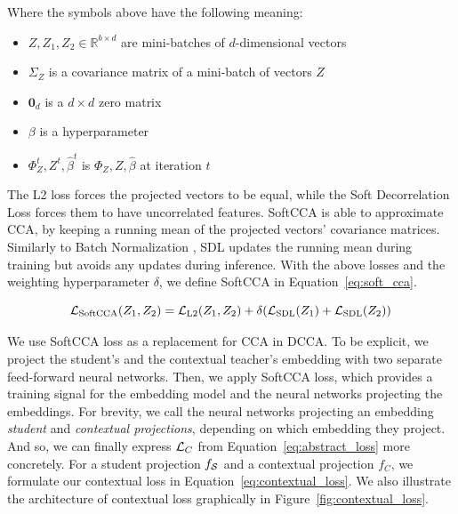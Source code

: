 Where the symbols above have the following meaning:

\begin{itemize}

  \item $Z, Z_1, Z_2 \in \mathbb{R}^{b \times d}$ are mini-batches of
    $d$-dimensional vectors

  \item $\Sigma_{Z}$ is a covariance matrix of a mini-batch of vectors $Z$

  \item $\bm{0}_d$ is a $d \times d$ zero matrix

  \item $\beta$ is a hyperparameter

  \item $\Phi_Z^t, Z^t, \hat{\beta}^t$ is $\Phi_Z, Z, \hat{\beta}$ at iteration
    $t$

\end{itemize}

The L2 loss forces the projected vectors to be equal, while the Soft
Decorrelation Loss forces them to have uncorrelated features. SoftCCA is able
to approximate CCA, by keeping a running mean of the projected vectors'
covariance matrices. Similarly to Batch Normalization \citep{ioffe2015batch},
SDL updates the running mean during training but avoids any updates during
inference. With the above losses and the weighting hyperparameter $\delta$, we
define SoftCCA in Equation~\ref{eq:soft_cca}.

\begin{equation}\label{eq:soft_cca}
  \mathcal{L}_{\text{SoftCCA}}(Z_1, Z_2) = \mathcal{L}_{\text{L2}}(Z_1, Z_2) +
      \delta ( \mathcal{L}_{\text{SDL}}(Z_1) + \mathcal{L}_{\text{SDL}}(Z_2) )
\end{equation}

We use SoftCCA loss as a replacement for CCA in DCCA. To be explicit, we
project the student's and the contextual teacher's embedding with two separate
feed-forward neural networks. Then, we apply SoftCCA loss, which provides a
training signal for the embedding model and the neural networks projecting the
embeddings. For brevity, we call the neural networks projecting an embedding
\emph{student} and \emph{contextual projections}, depending on which embedding
they project. And so, we can finally express $\mathcal{L}_C$ from
Equation~\ref{eq:abstract_loss} more concretely. For a student projection
$f_{\mathcal{S}}$ and a contextual projection $f_C$, we formulate our contextual
loss in Equation~\ref{eq:contextual_loss}. We also illustrate the architecture
of contextual loss graphically in Figure~\ref{fig:contextual_loss}.

